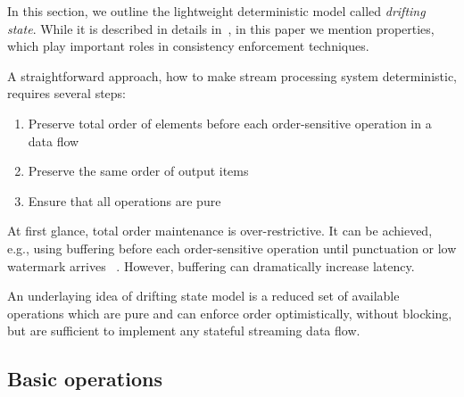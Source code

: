 



\label {fs-model-section}

In this section, we outline the lightweight deterministic model called {\em drifting state}. While it is described in details in~\cite{we2018adbis}, in this paper we mention properties, which play important roles in consistency enforcement techniques.

A straightforward approach, how to make stream processing system deterministic, requires several steps:
\begin{enumerate}
    \item Preserve total order of elements before each order-sensitive operation in a data flow
    \item Preserve the same order of output items
    \item Ensure that all operations are pure
\end{enumerate}

At first glance, total order maintenance is over-restrictive. It can be achieved, e.g., using buffering before each order-sensitive operation until punctuation or low watermark arrives ~\cite{Li:2008:OPN:1453856.1453890}. However, buffering can dramatically increase latency. 

An underlaying idea of drifting state model is a reduced set of available operations which are pure and can enforce order optimistically, without blocking, but are sufficient to implement any stateful streaming data flow. 

\subsection{Basic operations}

